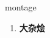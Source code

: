 
\begin{frame}
{\huge montage}
\begin{center}
\begin{enumerate}\Large
  \item \textbf{大杂烩}
\end{enumerate}
\end{center}
\end{frame}
